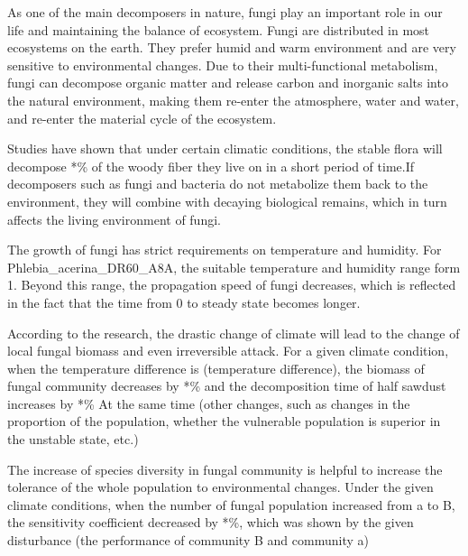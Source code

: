 \documentclass[12pt]{article}
\begin{document}
As one of the main decomposers in nature, fungi play an important role in our life and maintaining the balance of ecosystem. Fungi are distributed in most ecosystems on the earth. They prefer humid and warm environment and are very sensitive to environmental changes. Due to their multi-functional metabolism, fungi can decompose organic matter and release carbon and inorganic salts into the natural environment, making them re-enter the atmosphere, water and water, and re-enter the material cycle of the ecosystem.

Studies have shown that under certain climatic conditions, the stable flora will decompose *\% of the woody fiber they live on in a short period of time.If decomposers such as fungi and bacteria do not metabolize them back to the environment, they will combine with decaying biological remains, which in turn affects the living environment of fungi.

The growth of fungi has strict requirements on temperature and humidity. For Phlebia\_acerina\_DR60\_A8A, the suitable temperature and humidity range form 1. Beyond this range, the propagation speed of fungi decreases, which is reflected in the fact that the time from 0 to steady state becomes longer.

According to the research, the drastic change of climate will lead to the change of local fungal biomass and even irreversible attack. For a given climate condition, when the temperature difference is (temperature difference), the biomass of fungal community decreases by *\% and the decomposition time of half sawdust increases by *\%
At the same time (other changes, such as changes in the proportion of the population, whether the vulnerable population is superior in the unstable state, etc.)

The increase of species diversity in fungal community is helpful to increase the tolerance of the whole population to environmental changes. Under the given climate conditions, when the number of fungal population increased from a to B, the sensitivity coefficient decreased by *\%, which was shown by the given disturbance (the performance of community B and community a)
\end{document}
